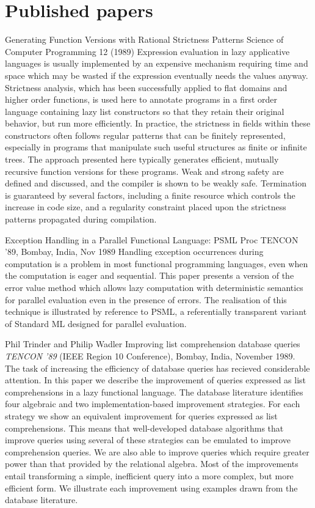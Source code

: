\section{Published papers}
{Generating Function Versions with Rational Strictness Patterns}
{Science of Computer Programming 12 (1989)}
{Expression evaluation in lazy applicative languages is usually implemented
by an expensive mechanism requiring time and space which may be wasted
if the expression eventually needs the values anyway. Strictness analysis,
which has been successfully applied to flat domains and higher order functions,
is used here to annotate programs in a first order language containing
lazy list constructors so that they retain their original behavior, but
run more efficiently. In practice, the strictness in fields within these
constructors often follows regular patterns that can be finitely
represented, especially in programs that manipulate such useful structures
as finite or infinite trees. The approach presented here typically generates
efficient, mutually recursive function versions for these programs.
Weak and strong safety are defined and discussed, and the compiler
is shown to be weakly safe. Termination is guaranteed by several factors,
including a finite resource which controls the increase in code size,
and a regularity constraint placed upon the strictness patterns
propagated during compilation.}

{Exception Handling in a Parallel Functional Language: PSML}
{Proc TENCON '89, Bombay, India, Nov 1989}
{
Handling exception occurrences during computation is a problem  in  most
functional programming languages, even when the computation is eager and
sequential.  This paper presents a version of  the  error  value  method
which  allows lazy computation with deterministic semantics for parallel
evaluation even in the presence of  errors.   The  realisation  of  this
technique   is   illustrated  by  reference  to  PSML,  a  referentially
transparent variant of Standard ML designed for parallel evaluation.
}

{Phil Trinder and Philip Wadler}
{Improving list comprehension database queries}
{{\em TENCON '89\/} (IEEE Region 10 Conference),
Bombay, India, November 1989.}
{
The task of increasing the efficiency of database queries has recieved
considerable attention. In this paper we describe the improvement of
queries expressed as list comprehensions in a lazy functional
language. The database literature identifies four algebraic and two
implementation-based improvement strategies. For each strategy we show
an equivalent improvement for queries expressed as list
comprehensions.  This means that well-developed database algorithms
that improve queries using several of these strategies can be emulated
to improve comprehension queries.  We are also able to improve queries
which require greater power than that provided by the relational
algebra.  Most of the improvements entail transforming a simple,
inefficient query into a more complex, but more efficient form. We
illustrate each improvement using examples drawn from the database
literature.
}

